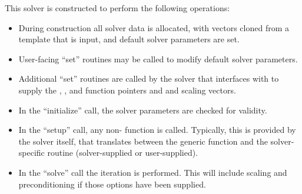 This solver is constructed to perform the following operations:
\begin{itemize}
\item During construction all {\nvector} solver data is allocated,
  with vectors cloned from a template {\nvector} that is input, and
  default solver parameters are set.
\item User-facing ``set'' routines may be called to modify default
  solver parameters.
\item Additional ``set'' routines are called by the {\sundials} solver
  that interfaces with {\sunlinsolspbcgs} to supply the 
  , , and  function pointers and
   and  scaling vectors.
\item In the ``initialize'' call, the solver parameters are checked
  for validity.
\item In the ``setup'' call, any non- 
   function is called.  Typically, this is provided by
  the {\sundials} solver itself, that translates between the
  generic  function and the
  solver-specific routine (solver-supplied or user-supplied).
\item In the ``solve'' call the {\spbcg} iteration is performed.  This
  will include scaling and preconditioning if those options have been
  supplied.
\end{itemize}

